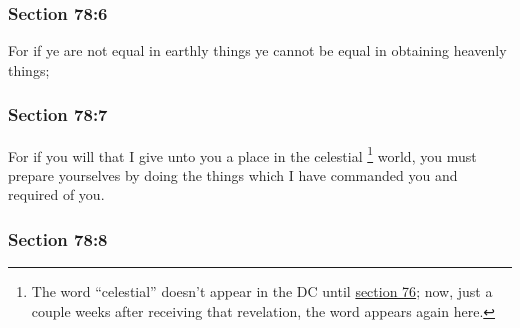 
	\subsubsection{Section 78:6} %
		\label{DC78-6}

		For if ye are not equal in earthly things ye cannot be equal in obtaining heavenly things;


	\subsubsection{Section 78:7} %
		\label{DC78-7}

		For if you will that I give unto you a place in the celestial%
			\footnote{%
				The word ``celestial'' doesn't appear in the DC until \hyperref[DC76]{section 76}; now, just a couple weeks after receiving that revelation, the word appears again here.
				}
		world, you must prepare yourselves by doing the things which I have commanded you and required of you.


	\subsubsection{Section 78:8} %
		\label{DC78-8}

